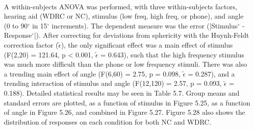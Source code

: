 \paragraph{}A within-subjects ANOVA was performed, with three within-subjects factors, hearing aid (WDRC or NC), stimulus (low freq, high freq, or phone), and angle (0 to 90$^\circ$ in 15$^\circ$ increments).  The dependent measure was the error (|Stimulus$^\circ$ - Response$^\circ$|).  After correcting for deviations from sphericity with the Huynh-Feldt correction factor ($\tilde{\epsilon}$), the only significant effect was a main effect of stimulus (F(2,20) = 121.64, p < 0.001, $\tilde{\epsilon}$ = 0.643), such that the high frequency stimulus was much more difficult than the phone or low frequency stimuli.  There was also a trending main effect of angle (F(6,60) = 2.75, p = 0.098, $\tilde{\epsilon}$ = 0.287), and a trending interaction of stimulus and angle (F(12,120) = 2.57, p = 0.093, $\tilde{\epsilon}$ = 0.188).  Detailed statistical results may be seen in Table 5.7.  Group means and standard errors are plotted, as a function of stimulus in Figure 5.25, as a function of angle in Figure 5.26, and combined in Figure 5.27.  Figure 5.28 also shows the distribution of responses on each condition for both NC and WDRC.

